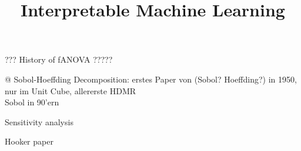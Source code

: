 \documentclass[11pt,compress,t,notes=noshow, aspectratio=169, xcolor=table]{beamer}
\title{Interpretable Machine Learning}
\date{}
\begin{document}
\newcommand{\titlefigure}{figure/open_blackbox}
\newcommand{\learninggoals}{
\item Understand one classical kind of functional decomposition: functional ANOVA (fANOVA).
\item [...]
\item Algorithm for calculating the components in a fANOVA}


\begin{frame}{??? History of fANOVA ?????}

@ Sobol-Hoeffding Decomposition: erstes Paper von (Sobol? Hoeffding?) in 1950, nur im Unit Cube, allererste HDMR \\

Sobol in 90'ern

Sensitivity analysis

Hooker paper


    
\end{frame}


    




    
\end{document}
